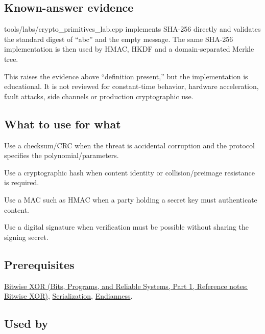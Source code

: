 \subsection{Known-answer evidence}\label{appendix-ed338677de0a-known-answer-evidence}

\hypertarget{appendix-ed338677de0a-known-answer-evidence}{}

tools/labs/crypto\_primitives\_lab.cpp implements SHA-256 directly and validates the standard digest of ``abc'' and the empty message. The same SHA-256 implementation is then used by HMAC, HKDF and a domain-separated Merkle tree.

This raises the evidence above ``definition present,'' but the implementation is educational. It is not reviewed for constant-time behavior, hardware acceleration, fault attacks, side channels or production cryptographic use.

\subsection{What to use for what}\label{appendix-ed338677de0a-what-to-use-for-what}

\hypertarget{appendix-ed338677de0a-what-to-use-for-what}{}

Use a checksum/CRC when the threat is accidental corruption and the protocol specifies the polynomial/parameters.

Use a cryptographic hash when content identity or collision/preimage resistance is required.

Use a MAC such as HMAC when a party holding a secret key must authenticate content.

Use a digital signature when verification must be possible without sharing the signing secret.

\subsection{Prerequisites}\label{appendix-ed338677de0a-prerequisites}

\hypertarget{appendix-ed338677de0a-prerequisites}{}

\href{../01-Bits-Programs-and-Reliable-Systems-P01/main.pdf\#nameddest=appendix-d49161831368}{Bitwise XOR (Bits, Programs, and Reliable Systems, Part 1, Reference notes: Bitwise XOR)}, \hyperref[appendix-91d09ebed979]{Serialization}, \hyperref[appendix-bc07c3d25b18]{Endianness}.

\subsection{Used by}\label{appendix-ed338677de0a-used-by}

